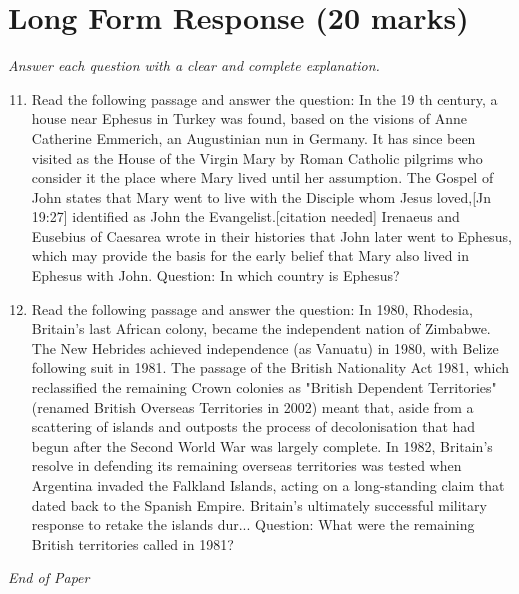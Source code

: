 \documentclass[12pt]{article}
\begin{document}
\section*{Long Form Response (20 marks)}
\textit{Answer each question with a clear and complete explanation.}
\begin{enumerate}[label=\arabic*.]
\setcounter{enumi}{10}
\item Read the following passage and answer the question: In the 19 th century, a house near Ephesus in Turkey was found, based on the visions of Anne Catherine Emmerich, an Augustinian nun in Germany. It has since been visited as the House of the Virgin Mary by Roman Catholic pilgrims who consider it the place where Mary lived until her assumption. The Gospel of John states that Mary went to live with the Disciple whom Jesus loved,[Jn 19:27] identified as John the Evangelist.[citation needed] Irenaeus and Eusebius of Caesarea wrote in their histories that John later went to Ephesus, which may provide the basis for the early belief that Mary also lived in Ephesus with John. Question: In which country is Ephesus?
\item Read the following passage and answer the question: In 1980, Rhodesia, Britain's last African colony, became the independent nation of Zimbabwe. The New Hebrides achieved independence (as Vanuatu) in 1980, with Belize following suit in 1981. The passage of the British Nationality Act 1981, which reclassified the remaining Crown colonies as "British Dependent Territories" (renamed British Overseas Territories in 2002) meant that, aside from a scattering of islands and outposts the process of decolonisation that had begun after the Second World War was largely complete. In 1982, Britain's resolve in defending its remaining overseas territories was tested when Argentina invaded the Falkland Islands, acting on a long-standing claim that dated back to the Spanish Empire. Britain's ultimately successful military response to retake the islands dur... Question: What were the remaining British territories called in 1981?
\end{enumerate}

\vfill
\noindent\textit{End of Paper}
\end{document}
